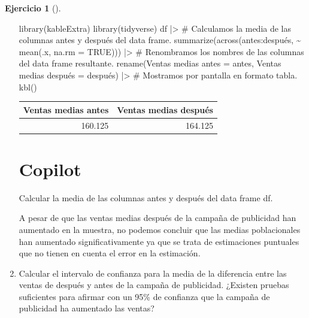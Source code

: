 \documentclass[
  a4paper,
]{scrreport}
\newenvironment{Shaded}{\begin{snugshade}}{\end{snugshade}}
\newcommand{\AttributeTok}[1]{\textcolor[rgb]{0.40,0.45,0.13}{#1}}
\newcommand{\CommentTok}[1]{\textcolor[rgb]{0.37,0.37,0.37}{#1}}
\newcommand{\ConstantTok}[1]{\textcolor[rgb]{0.56,0.35,0.01}{#1}}
\newcommand{\ExtensionTok}[1]{\textcolor[rgb]{0.00,0.23,0.31}{#1}}
\newcommand{\FunctionTok}[1]{\textcolor[rgb]{0.28,0.35,0.67}{#1}}
\newcommand{\NormalTok}[1]{\textcolor[rgb]{0.00,0.23,0.31}{#1}}
\newcommand{\OtherTok}[1]{\textcolor[rgb]{0.00,0.23,0.31}{#1}}
\newcommand{\SpecialCharTok}[1]{\textcolor[rgb]{0.37,0.37,0.37}{#1}}
\newcommand{\StringTok}[1]{\textcolor[rgb]{0.13,0.47,0.30}{#1}}
\theoremstyle{definition}
\newtheorem{exercise}{Ejercicio}[chapter]
\theoremstyle{remark}
\begin{document}
\begin{exercise}[]
\begin{enumerate}
\begin{tcolorbox}
\begin{Shaded}
\begin{Highlighting}[]
\FunctionTok{library}\NormalTok{(kableExtra)}
\FunctionTok{library}\NormalTok{(tidyverse)}
\NormalTok{df }\SpecialCharTok{|\textgreater{}} 
    \CommentTok{\# Calculamos la media de las columnas antes y después del data frame.}
    \FunctionTok{summarize}\NormalTok{(}\FunctionTok{across}\NormalTok{(antes}\SpecialCharTok{:}\NormalTok{después, }\SpecialCharTok{\textasciitilde{}} \FunctionTok{mean}\NormalTok{(.x, }\AttributeTok{na.rm =} \ConstantTok{TRUE}\NormalTok{))) }\SpecialCharTok{|\textgreater{}} 
    \CommentTok{\# Renombramos los nombres de las columnas del data frame resultante.}
    \FunctionTok{rename}\NormalTok{(}\StringTok{\textasciigrave{}}\AttributeTok{Ventas medias antes}\StringTok{\textasciigrave{}} \OtherTok{=}\NormalTok{ antes, }\StringTok{\textasciigrave{}}\AttributeTok{Ventas medias después}\StringTok{\textasciigrave{}} \OtherTok{=}\NormalTok{ después) }\SpecialCharTok{|\textgreater{}} 
    \CommentTok{\# Mostramos por pantalla en formato tabla.}
    \FunctionTok{kbl}\NormalTok{()}
\end{Highlighting}
\end{Shaded}

  \begin{tabular}[t]{r|r}
  \hline
  Ventas medias antes & Ventas medias después\\
  \hline
  160.125 & 164.125\\
  \hline
  \end{tabular}

  \section{Copilot}

\begin{Shaded}
\begin{Highlighting}[]
\ExtensionTok{Calcular}\NormalTok{ la media de las columnas antes y después del data frame df. }
\end{Highlighting}
\end{Shaded}

  A pesar de que las ventas medias después de la campaña de publicidad
  han aumentado en la muestra, no podemos concluir que las medias
  poblacionales han aumentado significativamente ya que se trata de
  estimaciones puntuales que no tienen en cuenta el error en la
  estimación.

  \end{tcolorbox}
\item
  Calcular el intervalo de confianza para la media de la diferencia
  entre las ventas de después y antes de la campaña de publicidad.
  ¿Existen pruebas suficientes para afirmar con un 95\% de confianza que
  la campaña de publicidad ha aumentado las ventas?


\end{enumerate}
\end{exercise}
\end{document}
